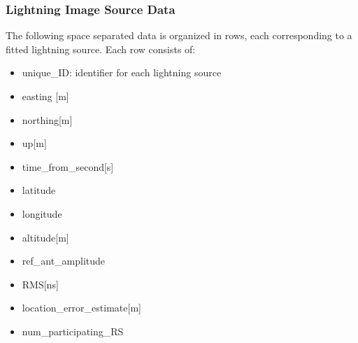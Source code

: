 \documentclass[a4paper,10pt,bibtotoc]{scrartcl}
\begin{document}
\subsubsection{Lightning Image Source Data}

The following space separated data is organized in rows, each corresponding to a fitted lightning source. Each row consists of:
\begin{itemize}
    \item unique\_ID: identifier for each lightning source
    \item easting [m]
    \item northing[m]
    \item up[m]
    \item time\_from\_second[s]
    \item latitude
    \item longitude
    \item altitude[m]
    \item ref\_ant\_amplitude
    \item RMS[ns] 
    \item location\_error\_estimate[m] 
    \item num\_participating\_RS
\end{itemize}





\end{document}
